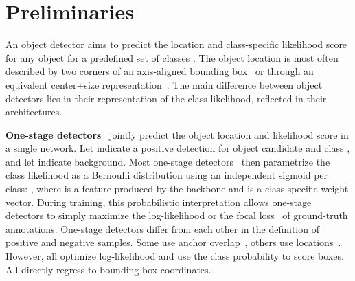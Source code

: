 \documentclass{article}
\begin{document}
\section{Preliminaries}

An object detector aims to predict the location  and class-specific likelihood score  for any object  for a predefined set of classes .
The object location  is most often described by two corners of an axis-aligned bounding box~\cite{ren2015faster,carion2020end} or through an equivalent center+size representation~\cite{tian2019fcos,zhou2019objects,zhu2020deformable}.
The main difference between object detectors lies in their representation of the class likelihood, reflected in their architectures.

\textbf{One-stage detectors}~\cite{redmon2018yolov3,lin2018focal,tian2019fcos,zhou2019objects} jointly predict the object location and likelihood score in a single network.
Let  indicate a positive detection for object candidate  and class , and let  indicate background.
Most one-stage detectors~\cite{lin2018focal,tian2019fcos,zhou2019objects} then parametrize the class likelihood as a Bernoulli distribution using an independent sigmoid per class: , where  is a feature produced by the backbone and  is a class-specific weight vector.
During training, this probabilistic interpretation allows one-stage detectors to simply maximize the log-likelihood  or the focal loss~\cite{lin2018focal} of ground-truth annotations.
One-stage detectors differ from each other in the definition of positive  and negative  samples.
Some use anchor overlap~\cite{lin2018focal,zhang2020bridging,paa-eccv2020}, others use locations~\cite{tian2019fcos}.
However, all optimize log-likelihood and use the class probability to score boxes.
All directly regress to bounding box coordinates.
\end{document}
